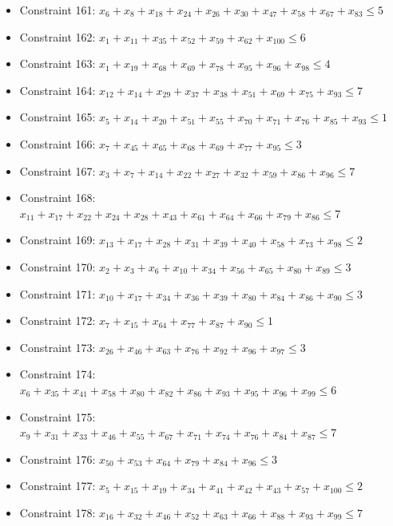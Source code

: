\documentclass[11pt]{article}
\begin{document}
\begin{itemize}
\item Constraint 161: $x_{6} + x_{8} + x_{18} + x_{24} + x_{26} + x_{30} + x_{47} + x_{58} + x_{67} + x_{83} \le 5$
\item Constraint 162: $x_{1} + x_{11} + x_{35} + x_{52} + x_{59} + x_{62} + x_{100} \le 6$
\item Constraint 163: $x_{1} + x_{19} + x_{68} + x_{69} + x_{78} + x_{95} + x_{96} + x_{98} \le 4$
\item Constraint 164: $x_{12} + x_{14} + x_{29} + x_{37} + x_{38} + x_{51} + x_{69} + x_{75} + x_{93} \le 7$
\item Constraint 165: $x_{5} + x_{14} + x_{20} + x_{51} + x_{55} + x_{70} + x_{71} + x_{76} + x_{85} + x_{93} \le 1$
\item Constraint 166: $x_{7} + x_{45} + x_{65} + x_{68} + x_{69} + x_{77} + x_{95} \le 3$
\item Constraint 167: $x_{3} + x_{7} + x_{14} + x_{22} + x_{27} + x_{32} + x_{59} + x_{86} + x_{96} \le 7$
\item Constraint 168: $x_{11} + x_{17} + x_{22} + x_{24} + x_{28} + x_{43} + x_{61} + x_{64} + x_{66} + x_{79} + x_{86} \le 7$
\item Constraint 169: $x_{13} + x_{17} + x_{28} + x_{31} + x_{39} + x_{40} + x_{58} + x_{73} + x_{98} \le 2$
\item Constraint 170: $x_{2} + x_{3} + x_{6} + x_{10} + x_{34} + x_{56} + x_{65} + x_{80} + x_{89} \le 3$
\item Constraint 171: $x_{10} + x_{17} + x_{34} + x_{36} + x_{39} + x_{80} + x_{84} + x_{86} + x_{90} \le 3$
\item Constraint 172: $x_{7} + x_{15} + x_{64} + x_{77} + x_{87} + x_{90} \le 1$
\item Constraint 173: $x_{26} + x_{46} + x_{63} + x_{76} + x_{92} + x_{96} + x_{97} \le 3$
\item Constraint 174: $x_{6} + x_{35} + x_{41} + x_{58} + x_{80} + x_{82} + x_{86} + x_{93} + x_{95} + x_{96} + x_{99} \le 6$
\item Constraint 175: $x_{9} + x_{31} + x_{33} + x_{46} + x_{55} + x_{67} + x_{71} + x_{74} + x_{76} + x_{84} + x_{87} \le 7$
\item Constraint 176: $x_{50} + x_{53} + x_{64} + x_{79} + x_{84} + x_{96} \le 3$
\item Constraint 177: $x_{5} + x_{15} + x_{19} + x_{34} + x_{41} + x_{42} + x_{43} + x_{57} + x_{100} \le 2$
\item Constraint 178: $x_{16} + x_{32} + x_{46} + x_{52} + x_{63} + x_{66} + x_{88} + x_{93} + x_{99} \le 7$

\end{itemize}
\end{document}
